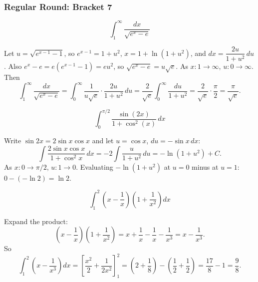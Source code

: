 \subsubsection*{Regular Round: Bracket 7}
\begin{questions}

\question \[\int_1^\infty \frac{dx}{\sqrt{e^x-e}}\]
\begin{solution}
Let $u=\sqrt{e^{x-1}-1}$, so $e^{x-1}=1+u^2$, $x=1+\ln(1+u^2)$, and $dx=\dfrac{2u}{1+u^2}\,du$.
Also $e^x-e=e\left(e^{x-1}-1\right)=eu^2$, so $\sqrt{e^x-e}=u\sqrt e$. As $x:1\to\infty$, $u:0\to\infty$. Then
\[
\int_1^\infty \frac{dx}{\sqrt{e^x-e}}=\int_0^\infty \frac{1}{u\sqrt e}\cdot\frac{2u}{1+u^2}\,du=\frac{2}{\sqrt e}\int_0^\infty\frac{du}{1+u^2}=\frac{2}{\sqrt e}\cdot\frac{\pi}{2}=\frac{\pi}{\sqrt e}.
\]
\end{solution}

\question \[\int_0^{\pi/2} \frac{\sin(2x)}{1+\cos^2(x)}\,dx\]
\begin{solution}
Write $\sin2x=2\sin x\cos x$ and let $u=\cos x$, $du=-\sin x\,dx$:
\[
\int \frac{2\sin x\cos x}{1+\cos^2x}\,dx=-2\int\frac{u}{1+u^2}\,du=-\ln(1+u^2)+C.
\]
As $x:0\to\pi/2$, $u:1\to0$. Evaluating $-\ln(1+u^2)$ at $u=0$ minus at $u=1$: $0-(-\ln2)=\ln2$.
\end{solution}

\question \[\int_1^2 \left(x-\frac{1}{x}\right)\left(1+\frac{1}{x^2}\right)dx\]
\begin{solution}
Expand the product:
\[
\left(x-\frac1x\right)\left(1+\frac1{x^2}\right)=x+\frac1x-\frac1x-\frac1{x^3}=x-\frac1{x^3}.
\]
So
\[
\int_1^2\left(x-\frac{1}{x^3}\right)dx=\left[\frac{x^2}{2}+\frac{1}{2x^2}\right]_1^2=\left(2+\frac18\right)-\left(\frac12+\frac12\right)=\frac{17}{8}-1=\frac98.
\]
\end{solution}

\end{questions}

